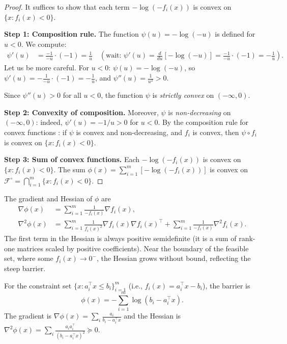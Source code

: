 \documentclass[11pt,a4paper]{article}
\begin{document}
\begin{proof}
It suffices to show that each term $-\log(-f_i(x))$ is convex on
$\{x : f_i(x) < 0\}$.

\textbf{Step 1: Composition rule.}
The function $\psi(u) = -\log(-u)$ is defined for $u < 0$. We compute:
\begin{align*}
  \psi'(u) &= \frac{-1}{-u} \cdot (-1) = \frac{1}{u}
  \quad (\text{wait: } \psi'(u) = \frac{d}{du}[-\log(-u)]
  = \frac{-1}{-u} \cdot (-1) = -\frac{1}{u}).
\end{align*}
Let us be more careful. For $u < 0$:
$\psi(u) = -\log(-u)$, so
$\psi'(u) = -\frac{1}{-u}\cdot(-1) = -\frac{1}{u}$, and
$\psi''(u) = \frac{1}{u^2} > 0$.

Since $\psi''(u) > 0$ for all $u < 0$, the function $\psi$ is
\emph{strictly convex} on $(-\infty, 0)$.

\textbf{Step 2: Convexity of composition.}
Moreover, $\psi$ is \emph{non-decreasing} on $(-\infty, 0)$: indeed,
$\psi'(u) = -1/u > 0$ for $u < 0$. By the composition rule for
convex functions \citep[Section~3.2.4]{boyd2004}: if $\psi$ is convex
and non-decreasing, and $f_i$ is convex, then $\psi \circ f_i$ is
convex on $\{x : f_i(x) < 0\}$.

\textbf{Step 3: Sum of convex functions.}
Each $-\log(-f_i(x))$ is convex on $\{x : f_i(x) < 0\}$. The sum
$\phi(x) = \sum_{i=1}^m [-\log(-f_i(x))]$ is convex on
$\mathcal{F}^{\circ} = \bigcap_{i=1}^m \{x : f_i(x) < 0\}$.
\end{proof}

\begin{remark}\label{rem:barrier-grad}
The gradient and Hessian of $\phi$ are
\begin{align}
  \nabla \phi(x) &= \sum_{i=1}^m \frac{1}{-f_i(x)}\nabla f_i(x),
    \label{eq:barrier-grad} \\
  \nabla^2 \phi(x) &= \sum_{i=1}^m \frac{1}{f_i(x)^2}
    \nabla f_i(x)\nabla f_i(x)^\top
    + \sum_{i=1}^m \frac{1}{-f_i(x)}\nabla^2 f_i(x).
    \label{eq:barrier-hess}
\end{align}
The first term in the Hessian is always positive semidefinite (it is
a sum of rank-one matrices scaled by positive coefficients). Near the
boundary of the feasible set, where some $f_i(x) \to 0^-$, the
Hessian grows without bound, reflecting the steep barrier.
\end{remark}

\begin{example}\label{ex:linear-barrier}
For the constraint set $\{x : a_i^\top x \le b_i\}_{i=1}^m$ (i.e.,
$f_i(x) = a_i^\top x - b_i$), the barrier is
\[
  \phi(x) = -\sum_{i=1}^m \log(b_i - a_i^\top x).
\]
The gradient is
$\nabla \phi(x) = \sum_i \frac{a_i}{b_i - a_i^\top x}$
and the Hessian is
$\nabla^2 \phi(x) = \sum_i \frac{a_i a_i^\top}{(b_i - a_i^\top x)^2}
\succeq 0$.
\end{example}
\end{document}

